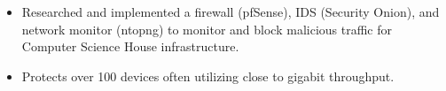 \documentclass[]{deedy-resume-openfont}
\begin{document}
\begin{minipage}[t]{0.66\textwidth}
\vspace{-3mm}
\begin{itemize}
  \itemsep-4pt
  \item Researched and implemented a firewall (pfSense), IDS (Security Onion), and network monitor (ntopng) to monitor and block malicious traffic for Computer Science House infrastructure.
  \item Protects over 100 devices often utilizing close to gigabit throughput.
\end{itemize}
\vspace{-5mm}
\sectionsep

\end{minipage} 
\end{document}
